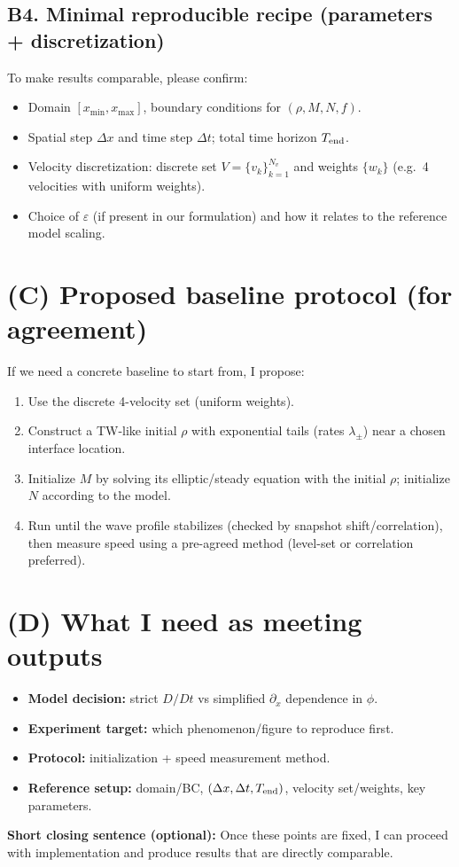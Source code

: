\documentclass[11pt]{article}
\newcommand{\Dt}{\Delta t}
\newcommand{\Dx}{\Delta x}
\newcommand{\eps}{\varepsilon}
\begin{document}
\subsection*{B4. Minimal reproducible recipe (parameters + discretization)}
To make results comparable, please confirm:
\begin{itemize}[leftmargin=1.4em]
\item Domain $[x_{\min},x_{\max}]$, boundary conditions for $(\rho,M,N,f)$.
\item Spatial step $\Dx$ and time step $\Dt$; total time horizon $T_{\rm end}$.
\item Velocity discretization: discrete set $V=\{v_k\}_{k=1}^{N_v}$ and weights $\{w_k\}$ (e.g.\ 4 velocities with uniform weights).
\item Choice of $\eps$ (if present in our formulation) and how it relates to the reference model scaling.
\end{itemize}

\section*{(C) Proposed baseline protocol (for agreement)}
If we need a concrete baseline to start from, I propose:
\begin{enumerate}[leftmargin=1.8em]
\item Use the discrete 4-velocity set (uniform weights).
\item Construct a TW-like initial $\rho$ with exponential tails (rates $\lambda_\pm$) near a chosen interface location.
\item Initialize $M$ by solving its elliptic/steady equation with the initial $\rho$; initialize $N$ according to the model.
\item Run until the wave profile stabilizes (checked by snapshot shift/correlation), then measure speed using a pre-agreed method (level-set or correlation preferred).
\end{enumerate}

\section*{(D) What I need as meeting outputs}
\begin{itemize}[leftmargin=1.4em]
\item \textbf{Model decision:} strict $D/Dt$ vs simplified $\partial_x$ dependence in $\phi$.
\item \textbf{Experiment target:} which phenomenon/figure to reproduce first.
\item \textbf{Protocol:} initialization + speed measurement method.
\item \textbf{Reference setup:} domain/BC, $(\Dx,\Dt,T_{\rm end})$, velocity set/weights, key parameters.
\end{itemize}

\vspace{0.5em}
\noindent\textbf{Short closing sentence (optional):}  
Once these points are fixed, I can proceed with implementation and produce results that are directly comparable.
\end{document}
